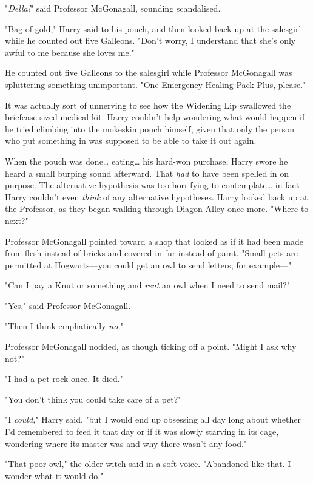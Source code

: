 "\emph{Della!}" said Professor McGonagall, sounding scandalised.

"Bag of gold," Harry said to his pouch, and then looked back up at the 
salesgirl while he counted out five Galleons. "Don't worry, I understand that 
she's only awful to me because she loves me."

He counted out five Galleons to the salesgirl while Professor McGonagall was 
spluttering something unimportant. "One Emergency Healing Pack Plus, please."

It was actually sort of unnerving to see how the Widening Lip swallowed the 
briefcase-sized medical kit. Harry couldn't help wondering what would happen if 
he tried climbing into the mokeskin pouch himself, given that only the person 
who put something in was supposed to be able to take it out again.

When the pouch was done{\ldots} eating{\ldots} his hard-won purchase, Harry 
swore he heard a small burping sound afterward. That \emph{had} to have been 
spelled in on purpose. The alternative hypothesis was too horrifying to 
contemplate{\ldots} in fact Harry couldn't even \emph{think} of any alternative 
hypotheses. Harry looked back up at the Professor, as they began walking 
through Diagon Alley once more. "Where to next?"

Professor McGonagall pointed toward a shop that looked as if it had been made 
from flesh instead of bricks and covered in fur instead of paint. "Small pets 
are permitted at Hogwarts---you could get an owl to send letters, for 
example---"

"Can I pay a Knut or something and \emph{rent} an owl when I need to send mail?"

"Yes," said Professor McGonagall.

"Then I think emphatically \emph{no.}"

Professor McGonagall nodded, as though ticking off a point. "Might I ask why 
not?"

"I had a pet rock once. It died."

"You don't think you could take care of a pet?"

"I \emph{could,}" Harry said, "but I would end up obsessing all day long about 
whether I'd remembered to feed it that day or if it was slowly starving in its 
cage, wondering where its master was and why there wasn't any food."

"That poor owl," the older witch said in a soft voice. "Abandoned like that. I 
wonder what it would do."

